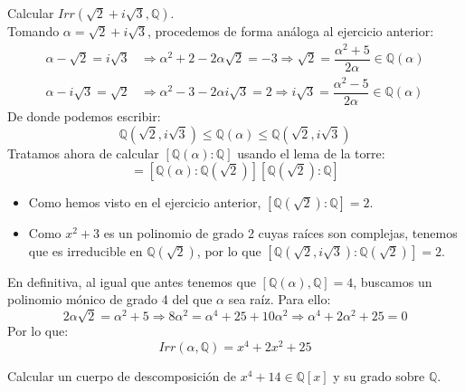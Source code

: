 \begin{ejercicio}
    Calcular $Irr(\sqrt{2}+i\sqrt{3},\mathbb{Q})$.\\

    \noindent
    Tomando $\alpha = \sqrt{2}+i\sqrt{3}$, procedemos de forma análoga al ejercicio anterior:
    \begin{align*}
        \alpha-\sqrt{2} = i\sqrt{3} &\Longrightarrow \alpha^2 + 2 - 2\alpha\sqrt{2} = -3 \Longrightarrow \sqrt{2} = \dfrac{\alpha^2+5}{2\alpha} \in \mathbb{Q}(\alpha)\\
        \alpha-i\sqrt{3} = \sqrt{2} &\Longrightarrow \alpha^2 -3 -2\alpha i \sqrt{3} = 2 \Longrightarrow i\sqrt{3} = \dfrac{\alpha^2-5}{2\alpha} \in \mathbb{Q}(\alpha)
    \end{align*}
    De donde podemos escribir:
    \begin{equation*}
        \mathbb{Q}(\sqrt{2},i\sqrt{3}) \leq \mathbb{Q}(\alpha) \leq \mathbb{Q}(\sqrt{2},i\sqrt{3})
    \end{equation*}
    Tratamos ahora de calcular $[\mathbb{Q}(\alpha):\mathbb{Q}]$ usando el lema de la torre:
    \begin{equation*}
        [\mathbb{Q}(\alpha):\mathbb{Q}] = [\mathbb{Q}(\alpha):\mathbb{Q}(\sqrt{2})][\mathbb{Q}(\sqrt{2}):\mathbb{Q}]
    \end{equation*}
    \begin{itemize}
        \item Como hemos visto en el ejercicio anterior, $[\mathbb{Q}(\sqrt{2}):\mathbb{Q}]=2$.
        \item Como $x^2+3$ es un polinomio de grado 2 cuyas raíces son complejas, tenemos que es irreducible en $\mathbb{Q}(\sqrt{2})$, por lo que $[\mathbb{Q}(\sqrt{2},i\sqrt{3}):\mathbb{Q}(\sqrt{2})] = 2$.
    \end{itemize}
    En definitiva, al igual que antes tenemos que $[\mathbb{Q}(\alpha),\mathbb{Q}] = 4$, buscamos un polinomio mónico de grado 4 del que $\alpha$ sea raíz. Para ello:
    \begin{equation*}
        2\alpha\sqrt{2} = \alpha^2 + 5 \Longrightarrow 8\alpha^2 = \alpha^4 + 25 + 10\alpha^2 \Longrightarrow \alpha^4 + 2\alpha^2 + 25 = 0
    \end{equation*}
    Por lo que:
    \begin{equation*}
        Irr(\alpha,\mathbb{Q}) = x^4+2x^2+25
    \end{equation*}
\end{ejercicio}

\begin{ejercicio} %
    Calcular un cuerpo de descomposición de $x^4+14\in \mathbb{Q}[x]$ y su grado sobre $\mathbb{Q}$.
\end{ejercicio}

